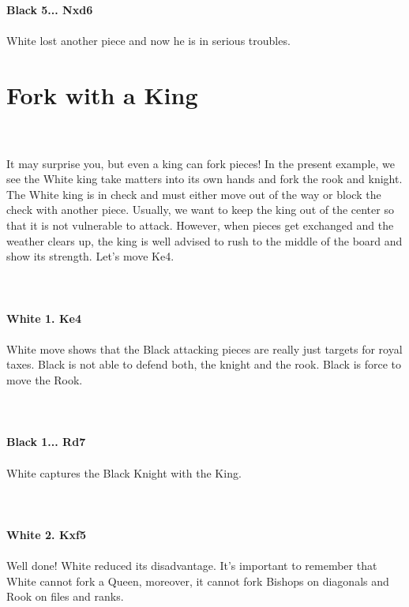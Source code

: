 \documentclass{article}
\begin{document}
\\
\textbf{Black 5... Nxd6}\\
\\
White lost another piece and now he is in serious troubles.\section{ Fork with a King}

\\
\\
It may surprise you, but even a king can fork pieces! In the present example, we see the White king take matters into its own hands and fork the rook and knight. The White king is in check and must either move out of the way or block the check with another piece. Usually, we want to keep the king out of the center so that it is not vulnerable to attack. However, when pieces get exchanged and the weather clears up, the king is well advised to rush to the middle of the board and show its strength. Let's move Ke4.\\
\\

\\
\\
\textbf{White 1. Ke4}\\
\\
White move shows that the Black attacking pieces are really just targets for royal taxes. Black is not able to defend both, the knight and the rook. Black is force to move the Rook.\\
\\

\\
\\
\textbf{Black 1... Rd7}\\
\\
White captures the Black Knight with the King.\\
\\

\\
\\
\textbf{White 2. Kxf5}\\
\\
Well done! White reduced its disadvantage. It's important to remember that White cannot fork a Queen, moreover, it cannot fork Bishops on diagonals and Rook on files and ranks.
\end{document}
